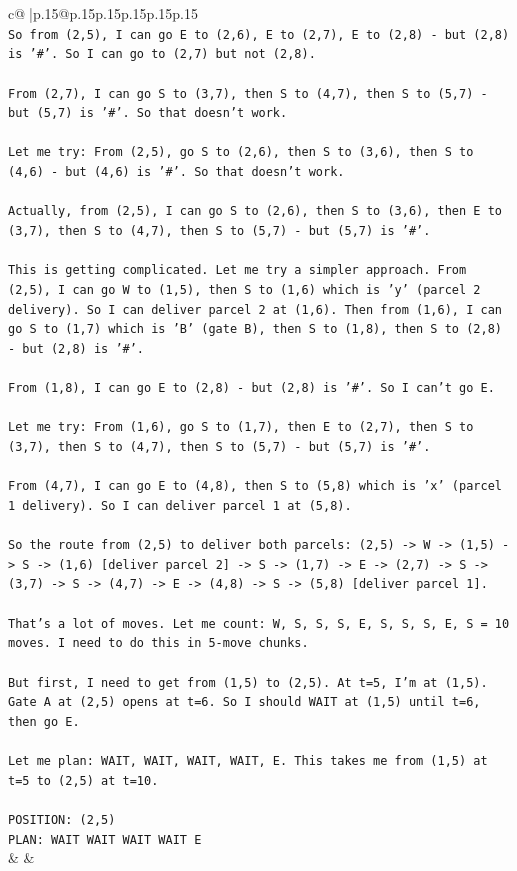 \documentclass{article}
\begin{document}
{\begin{supertabular}{c@{$\;$}|p{.15\linewidth}@{}p{.15\linewidth}p{.15\linewidth}p{.15\linewidth}p{.15\linewidth}p{.15\linewidth}}
{{{\\ 
\texttt{So from (2,5), I can go E to (2,6), E to (2,7), E to (2,8) {-} but (2,8) is '\#'. So I can go to (2,7) but not (2,8).} \\
\\ 
\texttt{From (2,7), I can go S to (3,7), then S to (4,7), then S to (5,7) {-} but (5,7) is '\#'. So that doesn't work.} \\
\\ 
\texttt{Let me try: From (2,5), go S to (2,6), then S to (3,6), then S to (4,6) {-} but (4,6) is '\#'. So that doesn't work.} \\
\\ 
\texttt{Actually, from (2,5), I can go S to (2,6), then S to (3,6), then E to (3,7), then S to (4,7), then S to (5,7) {-} but (5,7) is '\#'.} \\
\\ 
\texttt{This is getting complicated. Let me try a simpler approach. From (2,5), I can go W to (1,5), then S to (1,6) which is 'y' (parcel 2 delivery). So I can deliver parcel 2 at (1,6). Then from (1,6), I can go S to (1,7) which is 'B' (gate B), then S to (1,8), then S to (2,8) {-} but (2,8) is '\#'. } \\
\\ 
\texttt{From (1,8), I can go E to (2,8) {-} but (2,8) is '\#'. So I can't go E.} \\
\\ 
\texttt{Let me try: From (1,6), go S to (1,7), then E to (2,7), then S to (3,7), then S to (4,7), then S to (5,7) {-} but (5,7) is '\#'.} \\
\\ 
\texttt{From (4,7), I can go E to (4,8), then S to (5,8) which is 'x' (parcel 1 delivery). So I can deliver parcel 1 at (5,8).} \\
\\ 
\texttt{So the route from (2,5) to deliver both parcels: (2,5) {-}> W {-}> (1,5) {-}> S {-}> (1,6) {[}deliver parcel 2{]} {-}> S {-}> (1,7) {-}> E {-}> (2,7) {-}> S {-}> (3,7) {-}> S {-}> (4,7) {-}> E {-}> (4,8) {-}> S {-}> (5,8) {[}deliver parcel 1{]}.} \\
\\ 
\texttt{That's a lot of moves. Let me count: W, S, S, S, E, S, S, S, E, S = 10 moves. I need to do this in 5{-}move chunks.} \\
\\ 
\texttt{But first, I need to get from (1,5) to (2,5). At t=5, I'm at (1,5). Gate A at (2,5) opens at t=6. So I should WAIT at (1,5) until t=6, then go E.} \\
\\ 
\texttt{Let me plan: WAIT, WAIT, WAIT, WAIT, E. This takes me from (1,5) at t=5 to (2,5) at t=10.} \\
\\ 
\texttt{POSITION: (2,5)} \\
\texttt{PLAN: WAIT WAIT WAIT WAIT E} \\
            }
        }
    }
    & & \\ \\


\end{supertabular}}
\end{document}
